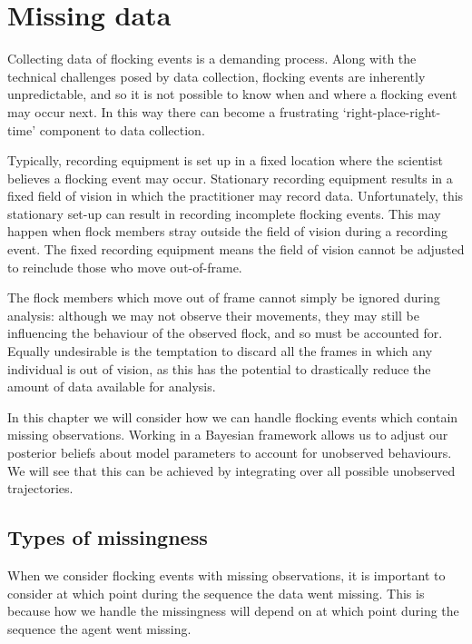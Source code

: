 \graphicspath{{fig/missing/}}

\chapter{Missing data}
\label{cha:missing}

Collecting data of flocking events is a demanding process. Along with the
technical challenges posed by data collection, flocking events are inherently
unpredictable, and so it is not possible to know when and where a flocking
event may occur next. In this way there can become a frustrating
`right-place-right-time' component to data collection.

Typically, recording equipment is set up in a fixed location where the
scientist believes a flocking event may occur. Stationary recording equipment
results in a fixed field of vision in which the practitioner may record data.
Unfortunately, this stationary set-up can result in recording incomplete
flocking events. This may happen when flock members stray outside the field of
vision during a recording event. The fixed recording equipment means the
field of vision cannot be adjusted to reinclude those who move out-of-frame.

The flock members which move out of frame cannot simply be ignored during
analysis: although we may not observe their movements, they may still be
influencing the behaviour of the observed flock, and so must be accounted for.
Equally undesirable is the temptation to discard all the frames in which any
individual is out of vision, as this has the potential to drastically reduce
the amount of data available for analysis.

In this chapter we will consider how we can handle flocking events which
contain missing observations. Working in a Bayesian framework allows us to
adjust our posterior beliefs about model parameters to account for unobserved
behaviours. We will see that this can be achieved by integrating over all 
possible unobserved trajectories.

\section{Types of missingness}

When we consider flocking events with missing observations, it is important to
consider at which point during the sequence the data went missing. This is
because how we handle the missingness will depend on at which point during the
sequence the agent went missing.


